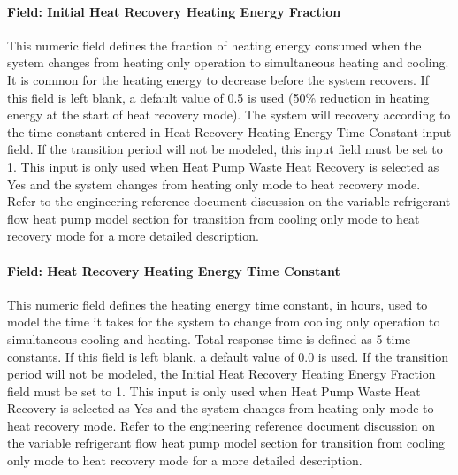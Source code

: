 \paragraph{Field: Initial Heat Recovery Heating Energy Fraction}\label{field-initial-heat-recovery-heating-energy-fraction}

This numeric field defines the fraction of heating energy consumed when the system changes from heating only operation to simultaneous heating and cooling. It is common for the heating energy to decrease before the system recovers. If this field is left blank, a default value of 0.5 is used (50\% reduction in heating energy at the start of heat recovery mode). The system will recovery according to the time constant entered in Heat Recovery Heating Energy Time Constant input field. If the transition period will not be modeled, this input field must be set to 1. This input is only used when Heat Pump Waste Heat Recovery is selected as Yes and the system changes from heating only mode to heat recovery mode. Refer to the engineering reference document discussion on the variable refrigerant flow heat pump model section for transition from cooling only mode to heat recovery mode for a more detailed description.

\paragraph{Field: Heat Recovery Heating Energy Time Constant}\label{field-heat-recovery-heating-energy-time-constant}

This numeric field defines the heating energy time constant, in hours, used to model the time it takes for the system to change from cooling only operation to simultaneous cooling and heating. Total response time is defined as 5 time constants. If this field is left blank, a default value of 0.0 is used. If the transition period will not be modeled, the Initial Heat Recovery Heating Energy Fraction field must be set to 1. This input is only used when Heat Pump Waste Heat Recovery is selected as Yes and the system changes from heating only mode to heat recovery mode. Refer to the engineering reference document discussion on the variable refrigerant flow heat pump model section for transition from cooling only mode to heat recovery mode for a more detailed description.


